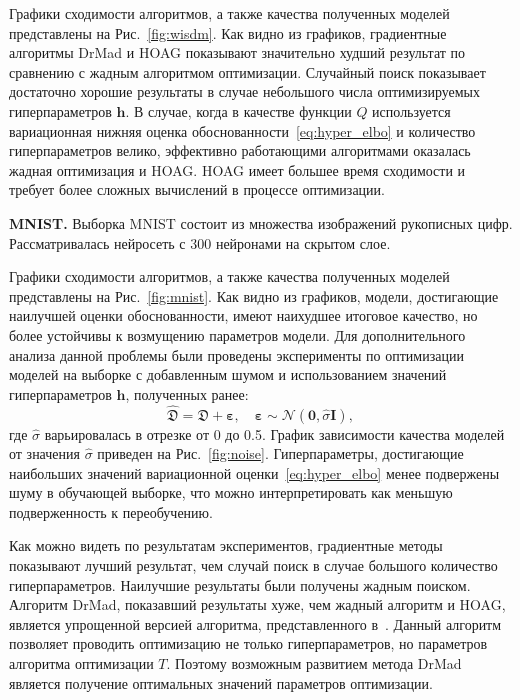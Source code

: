 Графики сходимости алгоритмов, а также качества полученных моделей представлены на Рис.~\ref{fig:wisdm}.
Как видно из графиков, градиентные алгоритмы DrMad и HOAG показывают значительно худший результат по сравнению с жадным алгоритмом оптимизации. Случайный поиск показывает достаточно хорошие результаты в случае небольшого числа оптимизируемых гиперпараметров $\mathbf{h}$. В случае, когда в качестве функции $Q$ используется вариационная нижняя оценка обоснованности~\eqref{eq:hyper_elbo} и количество гиперпараметров велико, эффективно работающими алгоритмами оказалась жадная оптимизация и HOAG. HOAG имеет большее время сходимости и требует более сложных вычислений в процессе оптимизации.


\textbf{MNIST. }
Выборка MNIST состоит из множества изображений рукописных цифр.
Рассматривалась нейросеть с 300 нейронами на скрытом слое.

Графики сходимости алгоритмов, а также качества полученных моделей представлены на Рис.~\ref{fig:mnist}.
Как видно из графиков, модели, достигающие наилучшей оценки обоснованности, имеют наихудшее итоговое качество, но более устойчивы к возмущению параметров модели. Для дополнительного анализа данной проблемы были проведены эксперименты по оптимизации моделей на выборке с добавленным шумом и использованием значений гиперпараметров $\mathbf{h}$, полученных ранее:
\[
    \hat{\mathfrak{D}} = \mathfrak{D} + \boldsymbol{\varepsilon}, \quad   \boldsymbol{\varepsilon} \sim \mathcal{N}(\mathbf{0}, \hat{\sigma}\mathbf{I}),
\]
где $\hat{\sigma}$ варьировалась в отрезке от 0 до 0.5.
График зависимости качества моделей от значения $\hat{\sigma}$ приведен на Рис.~\ref{fig:noise}.  Гиперпараметры, достигающие наибольших значений вариационной оценки~\eqref{eq:hyper_elbo} менее подвержены шуму в обучающей выборке, что можно интерпретировать как меньшую подверженность к переобучению.

Как можно видеть по результатам экспериментов, градиентные методы показывают лучший результат, чем случай поиск в случае большого количество гиперпараметров. Наилучшие результаты были получены жадным поиском. Алгоритм DrMad, показавший результаты хуже, чем жадный алгоритм и HOAG, является упрощенной версией алгоритма, представленного в~\cite{hyper_mad}. Данный алгоритм позволяет проводить оптимизацию не только гиперпараметров, но параметров алгоритма оптимизации $T$. Поэтому возможным развитием  метода DrMad является получение оптимальных значений параметров оптимизации.


